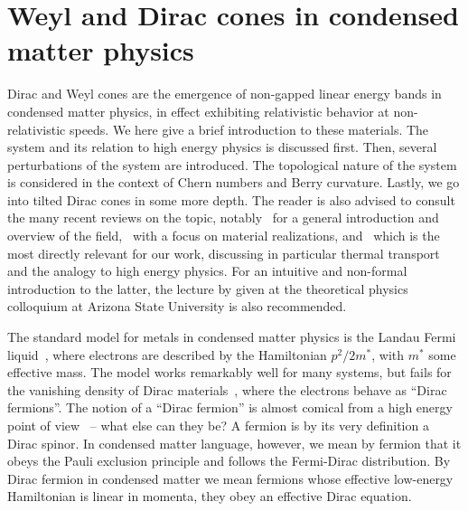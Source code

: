 \section[Weyl and Dirac cones]{Weyl and Dirac cones in condensed matter physics}
\label{sec:weyl-dirac-cones}
Dirac and Weyl cones are the emergence of non-gapped linear energy bands in condensed matter physics, in effect exhibiting relativistic behavior at non-relativistic speeds.
We here give a brief introduction to these materials.
The system and its relation to high energy physics is discussed first.
Then, several perturbations of the system are introduced.
The topological nature of the system is considered in the context of Chern numbers and Berry curvature.
Lastly, we go into tilted Dirac cones in some more depth.
The reader is also advised to consult the many recent reviews on the topic, notably~\textcite{armitageWeylDiracSemimetals2018} for a general introduction and overview of the field,~\textcite{jiaWeylSemimetalsFermi2016} with a focus on material realizations, and~\textcite{chernodubThermalTransportGeometry2021} which is the most directly relevant for our work, discussing in particular thermal transport and the analogy to high energy physics.
For an intuitive and non-formal introduction to the latter, the lecture by \textcite{vozmedianoTheoreticalPhysicsColloquium2021} given at the theoretical physics colloquium at Arizona State University is also recommended.


The standard model for metals in condensed matter physics is the Landau Fermi liquid~\cites{landauTheoryFermiLiquid1956,chernodubThermalTransportGeometry2021}, where electrons are described by the Hamiltonian \( p^2 /2 m^* \), with \( m^* \) some effective mass.
The model works remarkably well for many systems, but fails for the vanishing density of Dirac materials~\cite{chernodubThermalTransportGeometry2021,vozmedianoTheoreticalPhysicsColloquium2021}, where the electrons behave as ``Dirac fermions''.
The notion of a ``Dirac fermion'' is almost comical from a high energy point of view~\cites{chernodubThermalTransportGeometry2021,vozmedianoTheoreticalPhysicsColloquium2021} -- what else can they be?
A fermion is by its very definition a Dirac spinor.
In condensed matter language, however, we mean by fermion that it obeys the Pauli exclusion principle and follows the Fermi-Dirac distribution.
By Dirac fermion in condensed matter we mean fermions whose effective low-energy Hamiltonian is linear in momenta, they obey an effective Dirac equation.

